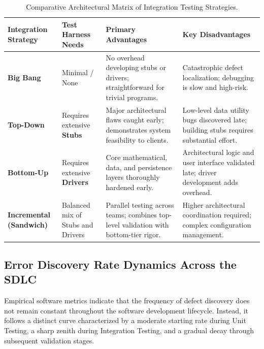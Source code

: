 \documentclass[11pt,a4paper]{article}
\begin{document}
\begin{table}[htbp]
\centering
\small
\renewcommand{\arraystretch}{1.25}
\begin{tabularx}{\textwidth}{L{2.5cm} L{3.2cm} Y L{3.2cm}}
\toprule
{}
\textbf{Integration Strategy} & \textbf{Test Harness Needs} & \textbf{Primary Advantages} & \textbf{Key Disadvantages} \\
\midrule
\textbf{Big Bang} & Minimal / None & No overhead developing stubs or drivers; straightforward for trivial programs. & Catastrophic defect localization; debugging is slow and high-risk. \\
\textbf{Top-Down} & Requires extensive \textbf{Stubs} & Major architectural flaws caught early; demonstrates system feasibility to clients. & Low-level data utility bugs discovered late; building stubs requires substantial effort. \\
\textbf{Bottom-Up} & Requires extensive \textbf{Drivers} & Core mathematical, data, and persistence layers thoroughly hardened early. & Architectural logic and user interface validated late; driver development adds overhead. \\
\textbf{Incremental (Sandwich)} & Balanced mix of Stubs and Drivers & Parallel testing across teams; combines top-level validation with bottom-tier rigor. & Higher architectural coordination required; complex configuration management. \\
\bottomrule
\end{tabularx}
\caption{Comparative Architectural Matrix of Integration Testing Strategies.}
\label{tab:integration_matrix}
\end{table}

\subsection{Error Discovery Rate Dynamics Across the SDLC}
Empirical software metrics indicate that the frequency of defect discovery does not remain constant throughout the software development lifecycle. Instead, it follows a distinct curve characterized by a moderate starting rate during Unit Testing, a sharp zenith during Integration Testing, and a gradual decay through subsequent validation stages.
\end{document}
